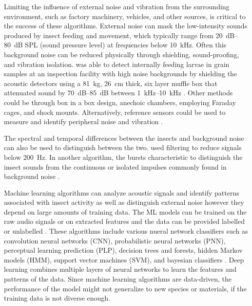 Limiting the influence of external noise and vibration from the surrounding environment, such as factory machinery, vehicles, and other sources,  is critical to the success of these algorithms. External noise can mask the low-intensity sounds produced by insect feeding and movement, which typically range from \SIrange{20}{80}{\deci\bel} SPL (sound pressure level) at frequencies below \SI{10}{\kilo\hertz}. Often this background noise can be reduced physically through shielding, sound-proofing, and vibration isolation. \citeauthor{mankinNoiseShieldingAcoustic1996} was able to detect internally feeding larvae in grain samples at an inspection facility with high noise backgrounds by shielding the acoustic detectors using a \SI{81}{\kilo\gram}, \SI{26}{\centi\meter} thick, six layer muffle box that attenuated sound by \SIrange{70}{85}{\deci\bel} between \SIrange{1}{10}{\kilo\hertz} \cite{mankinNoiseShieldingAcoustic1996}. Other methods could be through box in a box design, anechoic chambers, employing Faraday cages, and shock mounts. Alternatively, reference sensors could be used to measure and identify peripheral noise and vibration \cite{mankinAcousticIndicatorsTargeted2010}.

The spectral and temporal differences between the insects and background noise can also be used to distinguish between the two. \citeauthor{mankinAcousticCharacteristicsDynastid2009} used filtering to reduce signals below \SI{200}{\hertz}. In another algorithm, the bursts characteristic to distinguish the insect sounds from the continuous or isolated impulses commonly found in background noise \cite{mankinDetectionAnoplophoraGlabripennis2008, mankinAcousticCharacteristicsDynastid2009}.

Machine learning algorithms can analyze acoustic signals and identify patterns associated with insect activity as well as distinguish external noise however they depend on large amounts of training data. The ML models can be trained on the raw audio signals or on extracted features and the data can be provided labelled or unlabelled \cite{kohlbergBuzzesBytesSystematic2024}. These algorithms include various nueral network classifiers such as convolution neural networks (CNN), probabilistic neural networks (PNN), perceptual learning prediction (PLP), decision trees and forests, hidden Markov models (HMM), support vector machines (SVM), and bayesian classifiers \cite{mankinAutomatedApplicationsAcoustics2021}. Deep learning combines multiple layers of neural networks to learn the features and patterns of the data. Since machine learning algorithms are data-driven, the performance of the model might not generalize to new species or materials, if the training data is not diverse enough.

